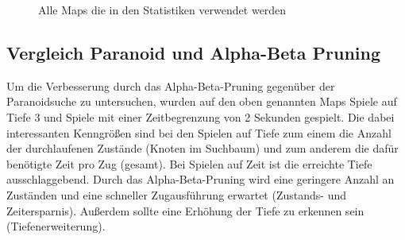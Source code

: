 \documentclass[12pt,a4paper,bibliography=totocnumbered,listof=totocnumbered]{scrartcl}
\begin{document}
\begin{figure}
		\qquad
		\qquad

		\caption{Alle Maps die in den Statistiken verwendet werden}
		\label{fig:statistik_maps}
	\end{figure}
	
	\newpage
	
    \subsection{Vergleich Paranoid und Alpha-Beta Pruning}
    \vspace{1em}
    
    
    Um die Verbesserung durch das Alpha-Beta-Pruning gegenüber der Paranoidsuche zu untersuchen, wurden auf den oben genannten Maps Spiele auf Tiefe 3 und Spiele mit einer Zeitbegrenzung von 2 Sekunden gespielt. Die dabei interessanten Kenngrößen sind bei den Spielen auf Tiefe zum einem die Anzahl der durchlaufenen Zustände (Knoten im Suchbaum) und zum anderem die dafür benötigte Zeit pro Zug (gesamt). Bei Spielen auf Zeit ist die erreichte Tiefe ausschlaggebend. Durch das Alpha-Beta-Pruning wird eine geringere Anzahl an Zuständen und eine schneller Zugausführung erwartet (Zustands- und Zeitersparnis). Außerdem sollte eine Erhöhung der Tiefe zu erkennen sein (Tiefenerweiterung).\newline
    
\end{document}
